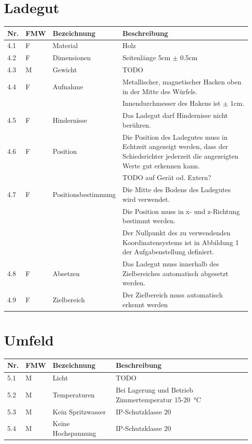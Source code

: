 \documentclass[a4paper]{report}
\begin{document}
\section{Ladegut}
\begin{tabular}{|p{}|p{}|p{}|p{}|}
	\hline
	\textbf{Nr.} & \textbf{FMW\footnotemark} & \textbf{Bezeichnung} & \textbf{Beschreibung} \\
	\hline
	4.1 & F & Material & Holz \\
	\hline
	4.2 & F &  Dimensionen & Seitenlänge 5cm $\pm$ 0.5cm \\
	\hline
	4.3 & M & Gewicht & TODO \\
	\hline
	4.4 & F & Aufnahme & Metallischer, magnetischer Hacken oben in der Mitte des Würfels.\\
	& & & Innendurchmesser des Hakens ist $\pm$ 1cm. \\
	\hline
	4.5 & F & Hindernisse & Das Ladegut darf Hindernisse nicht berühren. \\
	\hline
	4.6 & F & Position & Die Position des Ladegutes muss in Echtzeit angezeigt werden, dass der Schiedsrichter jederzeit die angezeigten Werte gut erkennen kann.\\
	& & & TODO auf Gerät od. Extern? \\
	\hline
	4.7 & F & Positionsbestimmung & Die Mitte des Bodens des Ladegutes wird verwendet.\\
	& & & Die Position muss in x- und z-Richtung bestimmt werden.\\
	& & & Der Nullpunkt des zu verwendenden Koordinatensystems ist in Abbildung 1 der Aufgabenstellung definiert. \\
	\hline
	4.8 & F & Absetzen & Das Ladegut muss innerhalb des Zielbereiches automatisch abgesetzt werden. \\
	\hline
	4.9 & F & Zielbereich & Der Zielbereich muss automatisch erkennt werden\\
	\hline
\end{tabular}

\section{Umfeld}
\begin{tabular}{|p{}|p{}|p{}|p{}|}
	\hline
	\textbf{Nr.} & \textbf{FMW\footnotemark} & \textbf{Bezeichnung} & \textbf{Beschreibung} \\
	\hline
	5.1 & M & Licht & TODO \\
	\hline
	5.2 & M & Temperaturen & Bei Lagerung und Betrieb Zimmertemperatur 15-\SI{20}{\degreeCelsius}\\
	\hline
	5.3 & M & Kein Spritzwasser & IP-Schutzklasse 20\\
	\hline
	5.4 & M & Keine Hochspannung & IP-Schutzklasse 20\\
	\hline 
\end{tabular}
\end{document}
